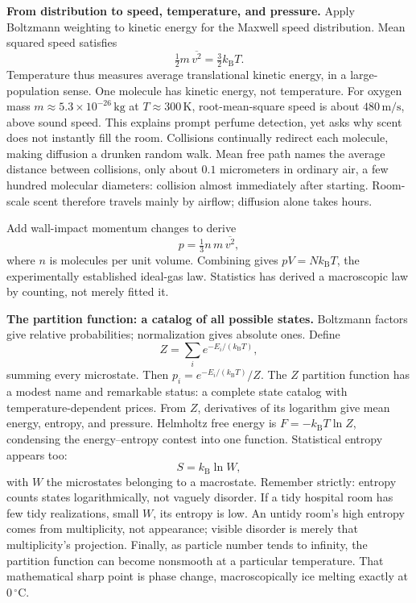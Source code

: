 \begin{mathbridge}
\textbf{From distribution to speed, temperature, and pressure.} Apply Boltzmann weighting to kinetic energy for the Maxwell speed distribution. Mean squared speed satisfies
\[
\tfrac12 m\,\overline{v^2} = \tfrac32 k_{\mathrm B} T .
\]
Temperature thus measures average translational kinetic energy, in a large-population sense. One molecule has kinetic energy, not temperature. For oxygen mass \(m\approx5.3\times10^{-26}\,\mathrm{kg}\) at \(T\approx300\,\mathrm{K}\), root-mean-square speed is about \(480\,\mathrm{m/s}\), above sound speed. This explains prompt perfume detection, yet asks why scent does not instantly fill the room. Collisions continually redirect each molecule, making diffusion a drunken random walk. Mean free path names the average distance between collisions, only about \(0.1\) micrometers in ordinary air, a few hundred molecular diameters: collision almost immediately after starting. Room-scale scent therefore travels mainly by airflow; diffusion alone takes hours.

Add wall-impact momentum changes to derive
\[
p = \tfrac13 n\, m\,\overline{v^2},
\]
where \(n\) is molecules per unit volume. Combining gives \(pV = N k_{\mathrm B}T\), the experimentally established ideal-gas law. Statistics has derived a macroscopic law by counting, not merely fitted it.
\end{mathbridge}

\begin{challenge}
\textbf{The partition function: a catalog of all possible states.} Boltzmann factors give relative probabilities; normalization gives absolute ones. Define
\[
Z = \sum_i e^{-E_i/(k_{\mathrm B} T)},
\]
summing every microstate. Then \(p_i = e^{-E_i/(k_{\mathrm B}T)}/Z\). The \(Z\) partition function has a modest name and remarkable status: a complete state catalog with temperature-dependent prices. From \(Z\), derivatives of its logarithm give mean energy, entropy, and pressure. Helmholtz free energy is \(F = -k_{\mathrm B}T\ln Z\), condensing the energy--entropy contest into one function. Statistical entropy appears too:
\[
S = k_{\mathrm B}\ln W,
\]
with \(W\) the microstates belonging to a macrostate. Remember strictly: entropy counts states logarithmically, not vaguely disorder. If a tidy hospital room has few tidy realizations, small \(W\), its entropy is low. An untidy room's high entropy comes from multiplicity, not appearance; visible disorder is merely that multiplicity's projection. Finally, as particle number tends to infinity, the partition function can become nonsmooth at a particular temperature. That mathematical sharp point is phase change, macroscopically ice melting exactly at \(0\,^\circ\mathrm{C}\).
\end{challenge}

